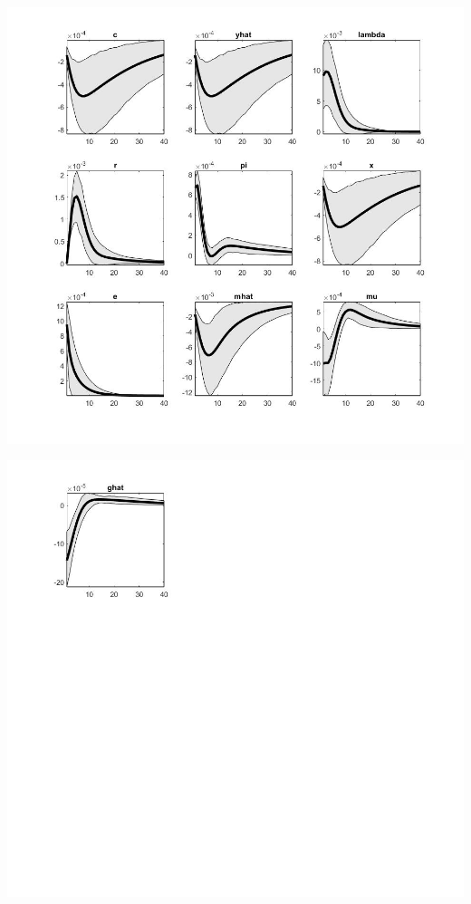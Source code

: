 \documentclass[11pt,preprint, authoryear]{elsarticle}
\let\origfigure\figure
\let\endorigfigure\endfigure
\renewenvironment{figure}[1][2] {
    \expandafter\origfigure\expandafter[H]
} {
    \endorigfigure
}
\numberwithin{equation}{section}
\numberwithin{figure}{section}
\numberwithin{table}{section}
\begin{document}
\begin{figure}
    \centering 
    \begin{minipage}[t]{8.2cm} 
        \centering 
        \includegraphics[width=\linewidth]{tay_e1.jpg} 
    \end{minipage} 
    \hspace{0.1cm} 
    \begin{minipage}[t]{8.2cm} 
        \centering 
        \includegraphics[width=\linewidth]{tay_e2.jpg} 
    \end{minipage}
    \caption{Orthogonalized Shock to Cost Push Shock - Taylor Rule}
    \label{tay_e}
\end{figure}
\end{document}
